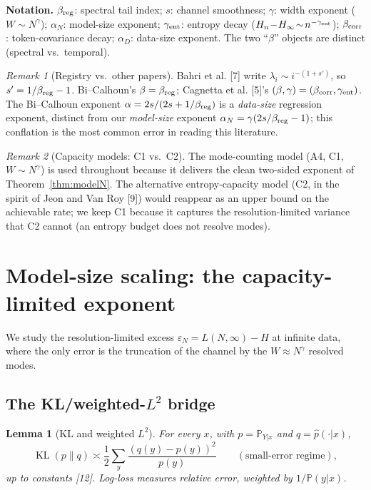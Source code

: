 \documentclass[12pt]{article}
\newcommand{\eps}{\varepsilon}
\newcommand{\KL}{\operatorname{KL}}
\newcommand{\Prob}{\mathbb{P}}
\newtheorem{lemma}[theorem]{Lemma}
\theoremstyle{remark}
\newtheorem{remark}{Remark}
\begin{document}
\noindent\textbf{Notation.}
$\beta_{\rm reg}$: spectral tail index;
$s$: channel smoothness;
$\gamma$: width exponent ($W\!\sim\!N^{\gamma}$);
$\alpha_N$: model-size exponent;
$\gamma_{\rm ent}$: entropy decay ($H_n\!-\!H_\infty\!\sim\!n^{-\gamma_{\rm ent}}$);
$\beta_{\rm corr}$: token-covariance decay;
$\alpha_D$: data-size exponent.  The two ``$\beta$'' objects are distinct
(spectral vs.\ temporal).

\begin{remark}[Registry vs.\ other papers]
\label{rem:registry}
Bahri et al. [7] write $\lambda_i\sim i^{-(1+s')}$, so
$s'=1/\beta_{\rm reg}-1$. Bi--Calhoun's $\beta=\beta_{\rm reg}$;
Cagnetta et al. [5]'s $(\beta,\gamma)=(\beta_{\rm corr},\gamma_{\rm ent})$.
The Bi--Calhoun exponent $\alpha=2s/(2s+1/\beta_{\rm reg})$ is a
\emph{data-size} regression exponent, distinct from our \emph{model-size}
exponent $\alpha_N=\gamma(2s/\beta_{\rm reg}-1)$; this conflation is the most
common error in reading this literature.
\end{remark}

\begin{remark}[Capacity models: C1 vs.\ C2]
\label{rem:capacity}
The mode-counting model (A4, C1, $W\!\sim\!N^{\gamma}$) is used throughout because
it delivers the clean two-sided exponent of Theorem~\ref{thm:modelN}. The
alternative entropy-capacity model (C2, in the spirit of
Jeon and Van Roy [9]) would reappear as an upper bound on the achievable
rate; we keep C1 because it captures the resolution-limited variance that C2
cannot (an entropy budget does not resolve modes).
\end{remark}

\section{Model-size scaling: the capacity-limited exponent}
\label{sec:modelsize}

We study the resolution-limited excess $\eps_N = L(N,\infty)-H$ at infinite
data, where the only error is the truncation of the channel by the $W\!\approx\!
N^\gamma$ resolved modes.

\subsection{The KL/weighted-$L^2$ bridge}
\begin{lemma}[KL and weighted $L^2$]
\label{lem:bridge}
For every $x$, with $p=\Prob_{Y|x}$ and $q=\hat p(\cdot|x)$,
\begin{equation}
  \KL(p\|q) \asymp \frac12 \sum_y \frac{(q(y)-p(y))^2}{p(y)}
  \qquad (\text{small-error regime}),
  \label{eq:bridge}
\end{equation}
up to constants [12].  Log-loss measures \emph{relative} error,
weighted by $1/\Prob(y|x)$.
\end{lemma}
\end{document}
